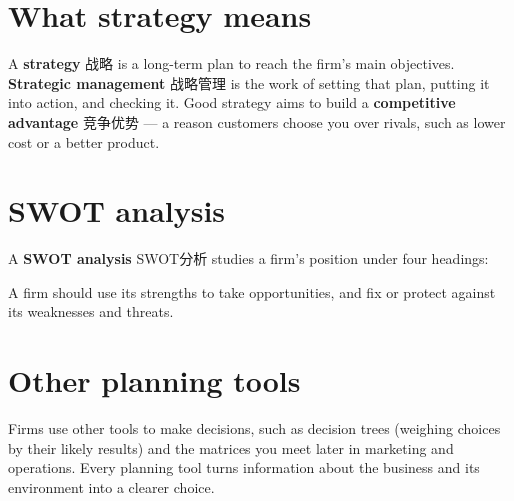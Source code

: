 \documentclass[11pt]{article}
\begin{document}
\section*{What strategy means}

A \textbf{strategy} 战略 is a long-term plan to reach the firm's main objectives. \textbf{Strategic management} 战略管理 is the work of setting that plan, putting it into action, and checking it. Good strategy aims to build a \textbf{competitive advantage} 竞争优势 — a reason customers choose you over rivals, such as lower cost or a better product.

\section*{SWOT analysis}

A \textbf{SWOT analysis} SWOT分析 studies a firm's position under four headings:

\begin{center}
\end{center}

A firm should use its strengths to take opportunities, and fix or protect against its weaknesses and threats.

\section*{Other planning tools}

Firms use other tools to make decisions, such as decision trees (weighing choices by their likely results) and the matrices you meet later in marketing and operations. Every planning tool turns information about the business and its environment into a clearer choice.
\end{document}
